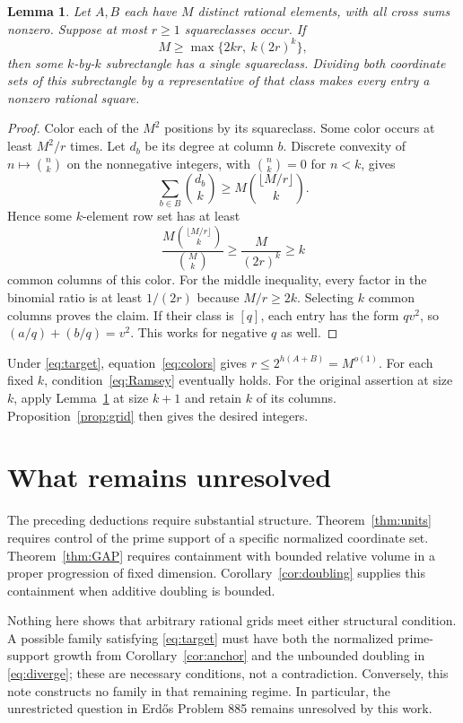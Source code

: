 \documentclass[11pt,letterpaper]{article}
\newtheorem{lemma}[theorem]{Lemma}
\theoremstyle{remark}\newtheorem{remark}[theorem]{Remark}
\begin{document}
\begin{lemma}\label{lem:Ramsey}
Let $A,B$ each have $M$ distinct rational elements, with all cross sums nonzero. Suppose at most $r\ge1$ squareclasses occur. If
\begin{equation}\label{eq:Ramsey}
 M\ge\max\{2kr,\ k(2r)^k\},
\end{equation}
then some $k$-by-$k$ subrectangle has a single squareclass. Dividing both coordinate sets of this subrectangle by a representative of that class makes every entry a nonzero rational square.
\end{lemma}
\begin{proof}
Color each of the $M^2$ positions by its squareclass. Some color occurs at least $M^2/r$ times. Let $d_b$ be its degree at column $b$. Discrete convexity of $n\mapsto\binom nk$ on the nonnegative integers, with $\binom nk=0$ for $n<k$, gives
\[
 \sum_{b\in B}\binom{d_b}{k}\ge M\binom{\lfloor M/r\rfloor}{k}.
\]
Hence some $k$-element row set has at least
\[
 \frac{M\binom{\lfloor M/r\rfloor}{k}}{\binom Mk}
 \ge \frac{M}{(2r)^k}\ge k
\]
common columns of this color. For the middle inequality, every factor in the binomial ratio is at least $1/(2r)$ because $M/r\ge2k$. Selecting $k$ common columns proves the claim. If their class is $[q]$, each entry has the form $qv^2$, so $(a/q)+(b/q)=v^2$. This works for negative $q$ as well.
\end{proof}

Under \eqref{eq:target}, equation~\eqref{eq:colors} gives $r\le2^{h(A+B)}=M^{o(1)}$. For each fixed $k$, condition~\eqref{eq:Ramsey} eventually holds. For the original assertion at size $k$, apply Lemma~\ref{lem:Ramsey} at size $k+1$ and retain $k$ of its columns. Proposition~\ref{prop:grid} then gives the desired integers.

\section{What remains unresolved}
The preceding deductions require substantial structure. Theorem~\ref{thm:units} requires control of the prime support of a specific normalized coordinate set. Theorem~\ref{thm:GAP} requires containment with bounded relative volume in a proper progression of fixed dimension. Corollary~\ref{cor:doubling} supplies this containment when additive doubling is bounded.

Nothing here shows that arbitrary rational grids meet either structural condition. A possible family satisfying \eqref{eq:target} must have both the normalized prime-support growth from Corollary~\ref{cor:anchor} and the unbounded doubling in \eqref{eq:diverge}; these are necessary conditions, not a contradiction. Conversely, this note constructs no family in that remaining regime. In particular, the unrestricted question in Erd\H{o}s Problem 885 remains unresolved by this work.
\end{document}
